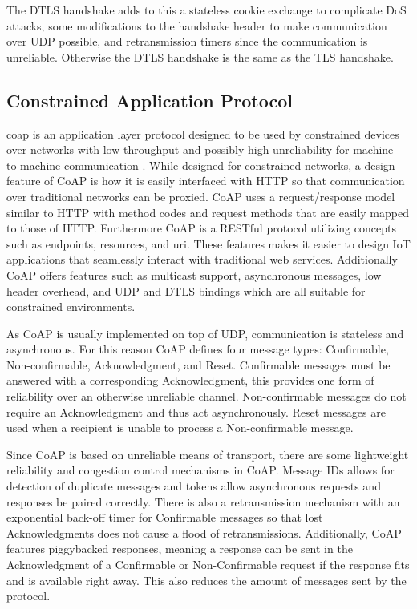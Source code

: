 \documentclass[0-thesis.tex]{subfiles}
\begin{document}
The DTLS handshake adds to this a stateless cookie exchange to complicate DoS attacks,
some modifications to the handshake header to make communication over UDP possible, and
retransmission timers since the communication is unreliable. Otherwise the DTLS handshake
is the same as the TLS handshake.

\subsection{Constrained Application Protocol}
\label{ssec:coap}
\acrfull{coap} is an application layer protocol designed to be used by constrained devices
over networks with low throughput and possibly high unreliability for machine-to-machine
communication \parencite{rfc7252}. While designed for constrained networks, a design
feature of CoAP is how it is easily interfaced with HTTP so that communication over
traditional networks can be proxied. CoAP uses a request/response model similar to HTTP
with method codes and request methods that are easily mapped to those of HTTP. Furthermore
CoAP is a RESTful protocol utilizing concepts such as endpoints, resources, and \gls{uri}.
These features makes it easier to design IoT applications that seamlessly interact with
traditional web services. Additionally CoAP offers features such as multicast support,
asynchronous messages, low header overhead, and UDP and DTLS bindings which are all
suitable for constrained environments.

As CoAP is usually implemented on top of UDP, communication is stateless and asynchronous.
For this reason CoAP defines four message types: Confirmable, Non-confirmable,
Acknowledgment, and Reset. Confirmable messages must be answered with a corresponding
Acknowledgment, this provides one form of reliability over an otherwise unreliable
channel. Non-confirmable messages do not require an Acknowledgment and thus act
asynchronously. Reset messages are used when a recipient is unable to process a
Non-confirmable message.

Since CoAP is based on unreliable means of transport, there are some lightweight
reliability and congestion control mechanisms in CoAP. Message IDs allows for detection of
duplicate messages and tokens allow asynchronous requests and responses be paired
correctly. There is also a retransmission mechanism with an exponential back-off timer for
Confirmable messages so that lost Acknowledgments does not cause a flood of
retransmissions. Additionally, CoAP features piggybacked responses, meaning a response can
be sent in the Acknowledgment of a Confirmable or Non-Confirmable request if the response
fits and is available right away. This also reduces the amount of messages sent by the
protocol.
\end{document}
